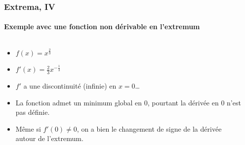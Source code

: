\documentclass[10pt,notheorems]{beamer}
\theoremstyle{plain}
\theoremstyle{definition} %
\begin{document}
\begin{frame}
  \frametitle{Extrema, IV}
  \framesubtitle{Exemple avec une fonction non dérivable en l'extremum}

  \begin{columns}[onlytextwidth]
    \begin{column}{.5\textwidth}
      \begin{itemize}

      \item $f(x) = x^{\frac{2}{3}}$\newline

      \item $f'(x) = \frac{2}{3}x^{-\frac{1}{3}}$\newline

      \item $f'$ a une discontinuité (infinie) en $x=0$\ldots\newline

      \item La fonction admet un minimum global en 0, pourtant la dérivée
        en 0 n'est pas définie.\newline

      \item Même si $f'(0) \neq 0$, on a bien le changement de signe
        de la dérivée autour de l'extremum.
      \end{itemize}
    \end{column}
    \begin{column}{.5\textwidth}
      \begin{center}
      \end{center}
    \end{column}
  \end{columns}

\end{frame}
\end{document}
